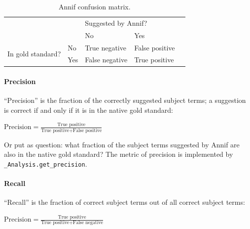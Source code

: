 \begin{table}[h]
\centering
\begin{tabular}{lllll}
 &                       & \multicolumn{2}{l}{Suggested by Annif?}            &  \\ \cline{3-4}
 & \multicolumn{1}{l|}{} & \multicolumn{1}{l|}{No} & \multicolumn{1}{l|}{Yes} &  \\ \cline{2-4}
\multicolumn{1}{l|}{\multirow{2}{*}{In gold standard?}} & \multicolumn{1}{l|}{No}  & \multicolumn{1}{l|}{True negative}  & \multicolumn{1}{l|}{False positive} &  \\ \cline{2-4}
\multicolumn{1}{l|}{}                                   & \multicolumn{1}{l|}{Yes} & \multicolumn{1}{l|}{False negative} & \multicolumn{1}{l|}{True positive}  &  \\ \cline{2-4}
\end{tabular}
\caption{Annif confusion matrix.}
\label{tab:confusion-matrix}
\end{table}

\hypertarget{precision}{%
\paragraph{Precision}\label{precision}}

``Precision'' is the fraction of the correctly suggested subject terms;
a suggestion is correct if and only if it is in the native gold
standard:

\begin{center} 
$\text{Precision} = \displaystyle \frac{\text{True positive}}{\text{True positive} + \text{False positive}}$
\end{center}

Or put as question: what fraction of the subject terms suggested by
Annif are also in the native gold standard? The metric of precision is
implemented by \texttt{\_Analysis.get\_precision}.

\hypertarget{recall}{%
\paragraph{Recall}\label{recall}}

``Recall'' is the fraction of correct subject terms out of all correct
subject terms:

\begin{center} 
$\text{Precision} = \displaystyle \frac{\text{True positive}}{\text{True positive} + \text{False negative}}$
\end{center}

